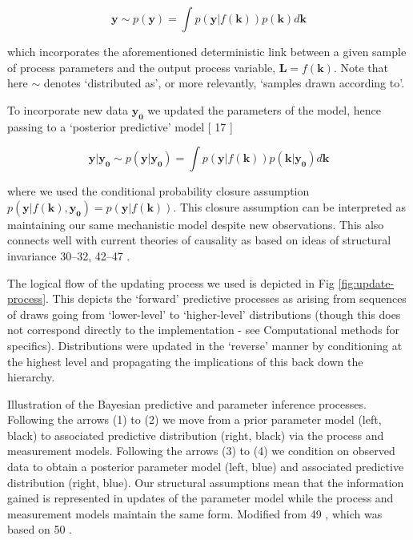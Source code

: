\documentclass[10pt,letterpaper]{article}
\providecommand{\DIFaddtex}[1]{{\protect\color{blue} \sf #1}} %
\providecommand{\DIFdeltex}[1]{{\protect\color{red} \scriptsize #1}} %
\providecommand{\DIFaddbegin}{} %
\providecommand{\DIFaddend}{} %
\providecommand{\DIFdelbegin}{} %
\providecommand{\DIFdelend}{} %
\providecommand{\DIFdelFL}[1]{\DIFdel{#1}} %
\providecommand{\DIFadd}[1]{\texorpdfstring{\DIFaddtex{#1}}{#1}} %
\providecommand{\DIFdel}[1]{\texorpdfstring{\DIFdeltex{#1}}{}} %
\begin{document}
\begin{equation}\mathbf{y} \sim p(\mathbf{y}) = \int p(\mathbf{y}|f(\mathbf{k}))p(\mathbf{k})d\mathbf{k}\label{eq:prior-predictive}\end{equation}

which incorporates the aforementioned deterministic link between a given
sample of process parameters and the output process variable,
\(\mathbf{L}=f(\mathbf{k})\). Note that here \(\sim\) denotes
`distributed as', or more relevantly, `samples drawn according to'.

To incorporate new data \(\mathbf{y_0}\) we updated the parameters of
the model, hence passing to a `posterior predictive' model {[}\DIFdelbegin \DIFdel{17}\DIFdelend \DIFaddbegin \DIFadd{20}\DIFaddend {]}

\begin{equation}\mathbf{y} | \mathbf{y_0} \sim p(\mathbf{y}|\mathbf{y_0}) = \int p(\mathbf{y}|f(\mathbf{k}))p(\mathbf{k}|\mathbf{y_0})d\mathbf{k}\label{eq:posterior-predictive}\end{equation}

where we used the conditional probability closure assumption
\(p(\mathbf{y}|f(\mathbf{k}),\mathbf{y_0}) = p(\mathbf{y}|f(\mathbf{k}))\).
This closure assumption can be interpreted as maintaining our same
mechanistic model despite new observations.
\DIFdelbegin \DIFdel{This also connects well with
current theories of causality as based on ideas of structural invariance
}%
\DIFdel{30--32, 42--47}%
\DIFdel{.
}\DIFdelend 

\DIFdelbegin \DIFdel{The logical flow of the updating process we used is depicted in Fig
\ref{fig:update-process}. This depicts the `forward' predictive
processes as arising from sequences of draws going from `lower-level' to
`higher-level' distributions (though this does not correspond directly
to the implementation - see Computational methods for specifics).
Distributions were updated in the `reverse' manner by conditioning at
the highest level and propagating the implications of this back down the
hierarchy.
}%

{%
\DIFdelFL{Illustration of the Bayesian predictive and parameter inference
processes. Following the arrows (1) to (2) we move from a prior
parameter model (left, black) to associated predictive distribution
(right, black) via the process and measurement models. Following the
arrows (3) to (4) we condition on observed data to obtain a posterior
parameter model (left, blue) and associated predictive distribution
(right, blue). Our structural assumptions mean that the information
gained is represented in updates of the parameter model while the
process and measurement models maintain the same form. Modified from
}%
\DIFdelFL{49}%
\DIFdelFL{, which was based on }%
\DIFdelFL{50}%
\DIFdelFL{.}%
}
\end{document}
